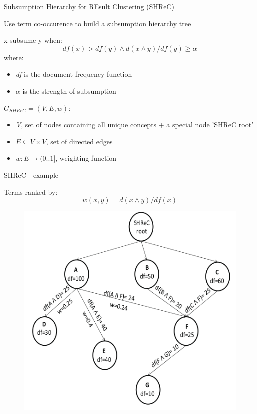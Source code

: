 \begin{frame}{Subsumption Hierarchy for REsult Clustering (SHReC)}

Use term co-occurence to build a subsumption hierarchy tree \newline

x subsume y when:
\[
	df(x) > df(y) \land d(x \land y) / df(y) \geq \alpha
\]
where:
\begin{itemize}
	\item \emph{df} is the document frequency function
	\item \emph{$ \alpha $} is the strength of subsumption \newline
\end{itemize}

$ G_{SHReC} = (V, E, w) $:
\begin{itemize}
	\item \emph{V}, set of nodes containing all unique concepts + a special node 'SHReC root'
	\item $ E \subseteq V \times V $, set of directed edges
	\item $ w : E \rightarrow (0..1] $, weighting function 
\end{itemize}

\end{frame}


\begin{frame}{SHReC - example}

Terms ranked by:
\[
	w(x, y) = d(x \land y) / df(x)
\]

\begin{figure}
	\includegraphics[scale=0.4]{img/SHReC-Example.png}
\end{figure}

\end{frame}


